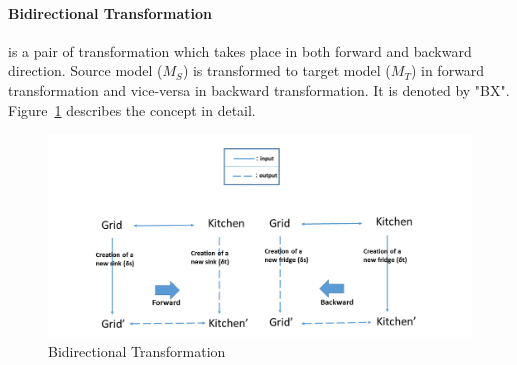 \paragraph{Bidirectional Transformation} is a pair of transformation which takes place in both forward and backward direction. Source model ($M_{S}$) is transformed to target model ($M_{T}$) in forward transformation and vice-versa in backward transformation. It is denoted by "BX". Figure~\ref{fig:BX_Diagram} describes the concept in detail.
\begin{figure}
	\includegraphics[width=1\textwidth]{figures/BX}
	\caption{Bidirectional Transformation}
	\label{fig:BX_Diagram}
\end{figure}

 



